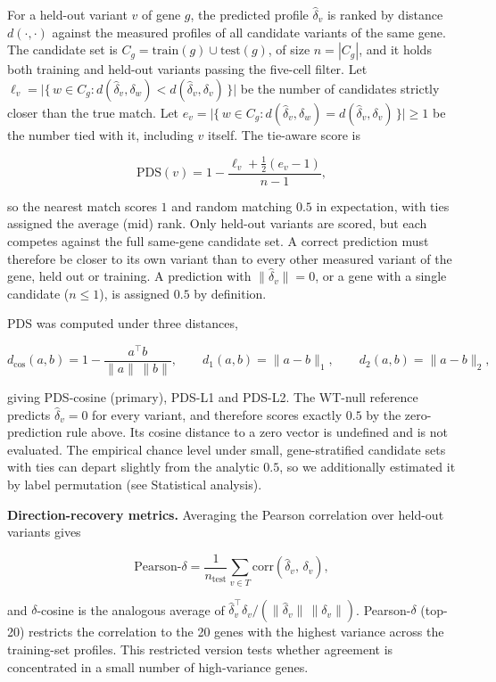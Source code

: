 \documentclass[11pt,letterpaper]{article}
\begin{document}
For a held-out variant $v$ of gene $g$, the predicted profile $\hat{\delta}_v$ is ranked by distance $d(\cdot,\cdot)$ against the measured profiles of all candidate variants of the same gene. The candidate set is $C_g = \mathrm{train}(g)\cup\mathrm{test}(g)$, of size $n = |C_g|$, and it holds both training and held-out variants passing the five-cell filter. Let $\ell_v = \big|\{\, w \in C_g : d(\hat{\delta}_v, \delta_w) < d(\hat{\delta}_v, \delta_v) \,\}\big|$ be the number of candidates strictly closer than the true match. Let $e_v = \big|\{\, w \in C_g : d(\hat{\delta}_v, \delta_w) = d(\hat{\delta}_v, \delta_v) \,\}\big| \ge 1$ be the number tied with it, including $v$ itself. The tie-aware score is

\[
\mathrm{PDS}(v) = 1 - \frac{\ell_v + \tfrac{1}{2}\left(e_v - 1\right)}{\,n - 1\,},
\]

so the nearest match scores $1$ and random matching $0.5$ in expectation, with ties assigned the average (mid) rank. Only held-out variants are scored, but each competes against the full same-gene candidate set. A correct prediction must therefore be closer to its own variant than to every other measured variant of the gene, held out or training. A prediction with $\lVert\hat{\delta}_v\rVert = 0$, or a gene with a single candidate ($n \le 1$), is assigned $0.5$ by definition.

PDS was computed under three distances,

\[
d_{\cos}(a,b) = 1 - \frac{a^{\top} b}{\lVert a\rVert\,\lVert b\rVert},\qquad d_{1}(a,b) = \lVert a-b\rVert_{1},\qquad d_{2}(a,b) = \lVert a-b\rVert_{2},
\]

giving PDS-cosine (primary), PDS-L1 and PDS-L2. The WT-null reference predicts $\hat{\delta}_v = 0$ for every variant, and therefore scores exactly $0.5$ by the zero-prediction rule above. Its cosine distance to a zero vector is undefined and is not evaluated. The empirical chance level under small, gene-stratified candidate sets with ties can depart slightly from the analytic $0.5$, so we additionally estimated it by label permutation (see Statistical analysis).

\textbf{Direction-recovery metrics.} Averaging the Pearson correlation over held-out variants gives

\[
\text{Pearson-}\delta = \frac{1}{n_{\mathrm{test}}}\sum_{v \in T} \mathrm{corr}\!\left(\hat{\delta}_v,\, \delta_v\right),
\]

and $\delta$-cosine is the analogous average of $\hat{\delta}_v^{\top}\delta_v / (\lVert \hat{\delta}_v\rVert\,\lVert \delta_v\rVert)$. Pearson-$\delta$ (top-20) restricts the correlation to the 20 genes with the highest variance across the training-set profiles. This restricted version tests whether agreement is concentrated in a small number of high-variance genes.
\end{document}
